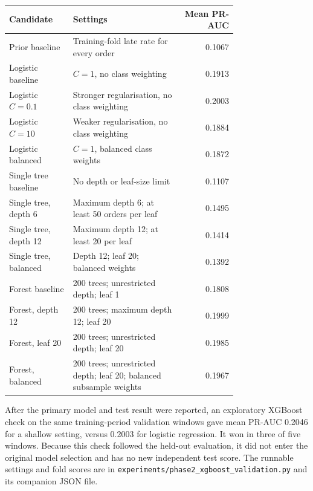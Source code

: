 \documentclass[11pt,a4paper]{article}
\begin{document}
\begin{center}\small
\begin{tabular}{@{}p{0.28\linewidth}p{0.47\linewidth}r@{}}
\toprule
Candidate & Settings & Mean PR-AUC \\
\midrule
Prior baseline & Training-fold late rate for every order & 0.1067 \\
Logistic baseline & $C=1$, no class weighting & 0.1913 \\
Logistic $C=0.1$ & Stronger regularisation, no class weighting & 0.2003 \\
Logistic $C=10$ & Weaker regularisation, no class weighting & 0.1884 \\
Logistic balanced & $C=1$, balanced class weights & 0.1872 \\
Single tree baseline & No depth or leaf-size limit & 0.1107 \\
Single tree, depth 6 & Maximum depth 6; at least 50 orders per leaf & 0.1495 \\
Single tree, depth 12 & Maximum depth 12; at least 20 per leaf & 0.1414 \\
Single tree, balanced & Depth 12; leaf 20; balanced weights & 0.1392 \\
Forest baseline & 200 trees; unrestricted depth; leaf 1 & 0.1808 \\
Forest, depth 12 & 200 trees; maximum depth 12; leaf 20 & 0.1999 \\
Forest, leaf 20 & 200 trees; unrestricted depth; leaf 20 & 0.1985 \\
Forest, balanced & 200 trees; unrestricted depth; leaf 20; balanced subsample weights & 0.1967 \\
\bottomrule
\end{tabular}
\end{center}

After the primary model and test result were reported, an exploratory XGBoost check on the same training-period validation windows gave mean PR-AUC 0.2046 for a shallow setting, versus 0.2003 for logistic regression. It won in three of five windows. Because this check followed the held-out evaluation, it did not enter the original model selection and has no new independent test score. The runnable settings and fold scores are in \texttt{experiments/phase2\_xgboost\_validation.py} and its companion JSON file.
\end{document}

